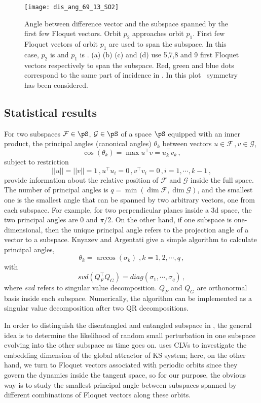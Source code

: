 \begin{description}
\begin{figure}[h]
  \centering
  \texttt{[image: dis\_ang\_69\_13\_SO2]}
  \caption{
    Angle between difference vector and the subspace spanned by
    the first few Floquet vectors. Orbit $p_2$ approaches orbit
    $p_1$. First few Floquet vectors
    of orbit $p_1$ are used to span the subspace. In this
    case, $p_2$ is  and $p_1$ is .
    (a) (b) (c) and (d) use 5,7,8 and 9 first Floquet vectors
    respectively to span the subspace. Red, green and blue dots
    correspond to the same part of incidence in
    . In this plot \ symmetry has been
    considered.
  }
  \label{fig:dis_ang_69_13_SO2}
\end{figure}

\clearpage
\subsection{Statistical results}

For two subspaces $\mathcal{F}\in\pS$, $\mathcal{G}\in\pS$ of a space
$\pS$ equipped with an inner product, the principal angles (canonical
angles) $\theta_k$ between vectors $u\in \mathcal{F}\,, v\in \mathcal{G}$,
\[
\cos(\theta_k) = \max
u^\top v = u_k^\top v_k
\,,
\]
subject to restriction
\[
||u|| = ||v||=1\,, u^\top u_i = 0\,, v^\top v_i = 0\,, i = 1,\cdots,k-1
\,,
\]
provide information about the relative position of $\mathcal{F}$ and
$\mathcal{G}$ inside the full space.
The number of principal angles is
$q = \min(\dim\mathcal{F}, \dim\mathcal{G})$,
and the smallest one is the smallest angle that can be spanned by two
arbitrary vectors, one from each subspace. For example, for two perpendicular
planes inside a 3d space, the two principal angles are $0$ and
$\pi/2$.  On the other hand, if one subspace is one-dimensional, then
the unique principal angle refers to the projection angle of a vector
to a subspace. Knyazev and Argentati give a simple algorithm
to calculate
principal angles,
\[
\theta_k = \arccos(\sigma_k)\;, k = 1,2,\cdots, q
\,,
\]
with
\[
svd(Q_F^\top Q_G) = diag(\sigma_1, \cdots, \sigma_q)
\,,
\]
where $svd$ refers to singular value decomposition. $Q_{F}$ and $Q_G$ are
orthonormal basis inside each subspace. Numerically, the algorithm can
be implemented as a singular value decomposition after two QR
decompositions.

In order to distinguish the disentangled and entangled subspace in \KSe,
the general idea is to determine the likelihood of random
small perturbation in one subspace evolving into the other
subspace as time goes on.  uses CLVs to investigate
the embedding dimension of the global attractor of KS system; here,
on the other hand, we turn to Floquet vectors associated
with periodic orbits since they govern the dynamics inside the
tangent space, so for our purpose, the obvious way is to study the smallest
principal angle between subspaces spanned by different combinations
of Floquet vectors along these orbits.


\end{description}
